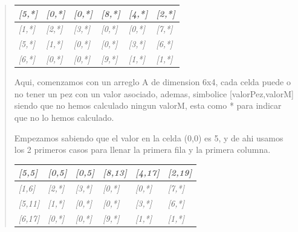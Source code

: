 \begin{quote}
    \begin{table}[H]
        \centering
        \begin{tabular}{|l|l|l|l|l|l|}
            \hline
            \textit{{[}5,*{]}} & \textit{{[}0,*{]}} & \textit{{[}0,*{]}} & \textit{{[}8,*{]}}                         & \textit{{[}4,*{]}}                         & \textit{{[}2,*{]}}                         \\ \hline
            \textit{{[}1,*{]}} & \textit{{[}2,*{]}} & \textit{{[}3,*{]}} & \textit{{[}0,*{]}}                         & \textit{{[}0,*{]}}                         & \textit{{[}7,*{]}}                         \\ \hline
            \textit{{[}5,*{]}} & \textit{{[}1,*{]}} & \textit{{[}0,*{]}} & \textit{{[}0,*{]}}                         & \textit{{[}3,*{]}}                         & \textit{{[}6,*{]}}                         \\ \hline
            \textit{{[}6,*{]}} & \textit{{[}0,*{]}} & \textit{{[}0,*{]}} & \cellcolor[HTML]{FFFFFF}\textit{{[}9,*{]}} & \cellcolor[HTML]{FFFFFF}\textit{{[}1,*{]}} & \cellcolor[HTML]{FFFFFF}\textit{{[}1,*{]}} \\ \hline
        \end{tabular}
    \end{table}

    Aqui, comenzamos con un arreglo A de dimension 6x4, cada celda puede o no tener un pez con un valor asociado, ademas, simbolice [valorPez,valorM] siendo que no hemos calculado ningun valorM, esta como * para indicar que no lo hemos calculado. \vspace{.2cm}

    Empezamos sabiendo que el valor en la celda (0,0) es 5, y de ahi usamos los 2 primeros casos para llenar la primera fila y la primera columna. \vspace{.2cm}
    \begin{table}[H]
        \centering
        \begin{tabular}{|l|l|l|l|l|l|}
            \hline
            \textit{{[}5,5{]}}  & \textit{{[}0,5{]}} & \textit{{[}0,5{]}} & \textit{{[}8,13{]}}                        & \textit{{[}4,17{]}}                        & \textit{{[}2,19{]}}                        \\ \hline
            \textit{{[}1,6{]}}  & \textit{{[}2,*{]}} & \textit{{[}3,*{]}} & \textit{{[}0,*{]}}                         & \textit{{[}0,*{]}}                         & \textit{{[}7,*{]}}                         \\ \hline
            \textit{{[}5,11{]}} & \textit{{[}1,*{]}} & \textit{{[}0,*{]}} & \textit{{[}0,*{]}}                         & \textit{{[}3,*{]}}                         & \textit{{[}6,*{]}}                         \\ \hline
            \textit{{[}6,17{]}} & \textit{{[}0,*{]}} & \textit{{[}0,*{]}} & \cellcolor[HTML]{FFFFFF}\textit{{[}9,*{]}} & \cellcolor[HTML]{FFFFFF}\textit{{[}1,*{]}} & \cellcolor[HTML]{FFFFFF}\textit{{[}1,*{]}} \\ \hline
        \end{tabular}
    \end{table}


\end{quote}
